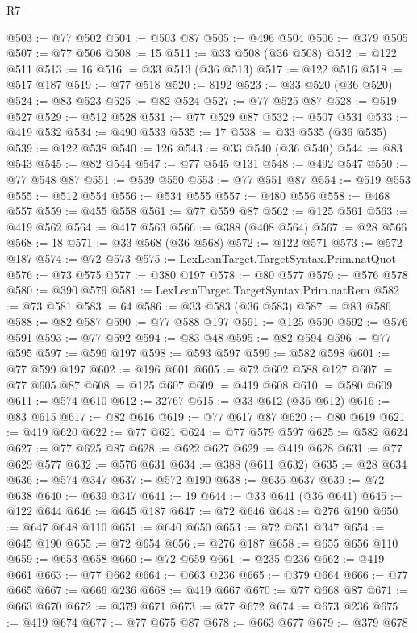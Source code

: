 \begin{lexlean}{R7}
\begin{coremodule}
@503 := @77 @502
@504 := @503 @87
@505 := @496 @504
@506 := @379 @505
@507 := @77 @506
@508 := 15
@511 := @33 @508 (@36 @508)
@512 := @122 @511
@513 := 16
@516 := @33 @513 (@36 @513)
@517 := @122 @516
@518 := @517 @187
@519 := @77 @518
@520 := 8192
@523 := @33 @520 (@36 @520)
@524 := @83 @523
@525 := @82 @524
@527 := @77 @525 @87
@528 := @519 @527
@529 := @512 @528
@531 := @77 @529 @87
@532 := @507 @531
@533 := @419 @532
@534 := @490 @533
@535 := 17
@538 := @33 @535 (@36 @535)
@539 := @122 @538
@540 := 126
@543 := @33 @540 (@36 @540)
@544 := @83 @543
@545 := @82 @544
@547 := @77 @545 @131
@548 := @492 @547
@550 := @77 @548 @87
@551 := @539 @550
@553 := @77 @551 @87
@554 := @519 @553
@555 := @512 @554
@556 := @534 @555
@557 := @480 @556
@558 := @468 @557
@559 := @455 @558
@561 := @77 @559 @87
@562 := @125 @561
@563 := @419 @562
@564 := @417 @563
@566 := @388 (@408 @564)
@567 := @28 @566
@568 := 18
@571 := @33 @568 (@36 @568)
@572 := @122 @571
@573 := @572 @187
@574 := @72 @573
@575 := LexLeanTarget.TargetSyntax.Prim.natQuot
@576 := @73 @575
@577 := @380 @197
@578 := @80 @577
@579 := @576 @578
@580 := @390 @579
@581 := LexLeanTarget.TargetSyntax.Prim.natRem
@582 := @73 @581
@583 := 64
@586 := @33 @583 (@36 @583)
@587 := @83 @586
@588 := @82 @587
@590 := @77 @588 @197
@591 := @125 @590
@592 := @576 @591
@593 := @77 @592
@594 := @83 @48
@595 := @82 @594
@596 := @77 @595
@597 := @596 @197
@598 := @593 @597
@599 := @582 @598
@601 := @77 @599 @197
@602 := @196 @601
@605 := @72 @602 @588 @127
@607 := @77 @605 @87
@608 := @125 @607
@609 := @419 @608
@610 := @580 @609
@611 := @574 @610
@612 := 32767
@615 := @33 @612 (@36 @612)
@616 := @83 @615
@617 := @82 @616
@619 := @77 @617 @87
@620 := @80 @619
@621 := @419 @620
@622 := @77 @621
@624 := @77 @579 @597
@625 := @582 @624
@627 := @77 @625 @87
@628 := @622 @627
@629 := @419 @628
@631 := @77 @629 @577
@632 := @576 @631
@634 := @388 (@611 @632)
@635 := @28 @634
@636 := @574 @347
@637 := @572 @190
@638 := @636 @637
@639 := @72 @638
@640 := @639 @347
@641 := 19
@644 := @33 @641 (@36 @641)
@645 := @122 @644
@646 := @645 @187
@647 := @72 @646
@648 := @276 @190
@650 := @647 @648 @110
@651 := @640 @650
@653 := @72 @651 @347
@654 := @645 @190
@655 := @72 @654
@656 := @276 @187
@658 := @655 @656 @110
@659 := @653 @658
@660 := @72 @659
@661 := @235 @236
@662 := @419 @661
@663 := @77 @662
@664 := @663 @236
@665 := @379 @664
@666 := @77 @665
@667 := @666 @236
@668 := @419 @667
@670 := @77 @668 @87
@671 := @663 @670
@672 := @379 @671
@673 := @77 @672
@674 := @673 @236
@675 := @419 @674
@677 := @77 @675 @87
@678 := @663 @677
@679 := @379 @678

\end{coremodule}
\end{lexlean}

